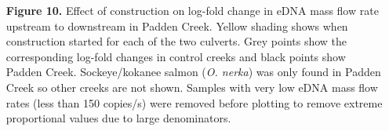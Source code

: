 \documentclass[
]{article}
\begin{document}
\begin{itemize}
\item[\textbf{Figure 10.}] Effect of construction on log-fold change in eDNA mass flow rate upstream to downstream in Padden Creek. Yellow shading shows when construction started for each of the two culverts. Grey points show the corresponding log-fold changes in control creeks and black points show Padden Creek. Sockeye/kokanee salmon (\emph{O. nerka}) was only found in Padden Creek so other creeks are not shown. Samples with very low eDNA mass flow rates (less than 150 copies/s) were removed before plotting to remove extreme proportional values due to large denominators.

\end{itemize}

\newpage
\end{document}
